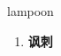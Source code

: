 
\begin{frame}
{\huge lampoon}
\begin{center}
\begin{enumerate}\Large
  \item \textbf{讽刺}
\end{enumerate}
\end{center}
\end{frame}

